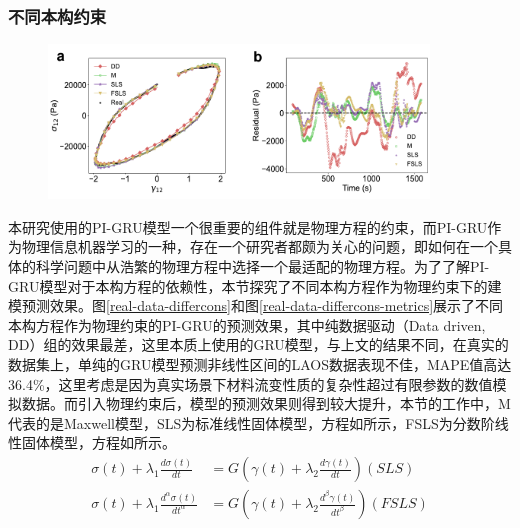 \subsubsection{不同本构约束}
\begin{figure}
  \centering
  \includegraphics[width=0.9\textwidth]{Fig/real-data-differcons.pdf}
\end{figure}
本研究使用的PI-GRU模型一个很重要的组件就是物理方程的约束，而PI-GRU作为物理信息机器学习的一种，存在一个研究者都颇为关心的问题，即如何在一个具体的科学问题中从浩繁的物理方程中选择一个最适配的物理方程。为了了解PI-GRU模型对于本构方程的依赖性，本节探究了不同本构方程作为物理约束下的建模预测效果。图\ref{real-data-differcons}和图\ref{real-data-differcons-metrics}展示了不同本构方程作为物理约束的PI-GRU的预测效果，其中纯数据驱动（Data driven, DD）组的效果最差，这里本质上使用的GRU模型，与上文的结果不同，在真实的数据集上，单纯的GRU模型预测非线性区间的LAOS数据表现不佳，MAPE值高达36.4\%，这里考虑是因为真实场景下材料流变性质的复杂性超过有限参数的数值模拟数据。而引入物理约束后，模型的预测效果则得到较大提升，本节的工作中，M代表的是Maxwell模型，SLS为标准线性固体模型，方程如所示，FSLS为分数阶线性固体模型，方程如所示。
\begin{align}
  \sigma(t) + \lambda_{1} \frac{d \sigma(t)}{d t}            & = G \left( \gamma(t) + \lambda_2 \frac{d \gamma(t)}{d t} \right) (SLS) \label{eq:sls}             \\
  \sigma(t) + \lambda_1 \frac{d^\alpha \sigma(t)}{dt^\alpha} & = G \left( \gamma(t) + \lambda_2 \frac{d^\beta \gamma(t)}{dt^\beta} \right)(FSLS) \label{eq:fsls}
\end{align}

